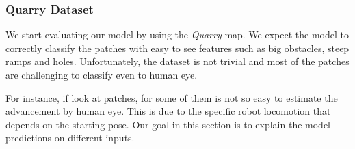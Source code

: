 \documentclass[../document.tex]{subfiles}
\begin{document}
\subsubsection{Quarry Dataset}
We start evaluating our model by using the \emph{Quarry} map. We expect the model to correctly classify the patches with easy to see features such as big obstacles, steep ramps and holes. Unfortunately, the dataset is not trivial and most of the patches are challenging to classify even to human eye. 

For instance, if look at patches, for some of them is not so easy to estimate the advancement by human eye. This is due to the specific robot locomotion that depends on the starting pose. Our goal in this section is to explain the model predictions on different inputs. 
\end{document}
